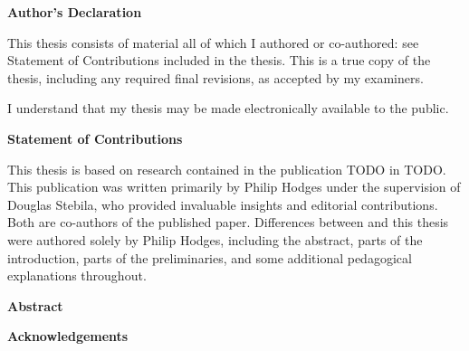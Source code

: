 \cleardoublepage %

 \begin{center}\textbf{Author's Declaration}\end{center}
  
 \noindent
This thesis consists of material all of which I authored or co-authored: see Statement of Contributions included in the thesis. This is a true copy of the thesis, including any required final revisions, as accepted by my examiners.
  \bigskip
  
  \noindent
I understand that my thesis may be made electronically available to the public.

\cleardoublepage


 \begin{center}\textbf{Statement of Contributions}\end{center}
 
 \noindent
This thesis is based on research contained in the publication TODO in TODO. This publication was written primarily by Philip Hodges under the supervision of Douglas Stebila, who provided invaluable insights and editorial contributions. Both are co-authors of the published paper. Differences between \cite{} and this thesis were authored solely by Philip Hodges, including the abstract, parts of the introduction, parts of the preliminaries, and some additional pedagogical explanations throughout.


\cleardoublepage


\begin{center}\textbf{Abstract}\end{center}



\cleardoublepage


\begin{center}\textbf{Acknowledgements}\end{center}

